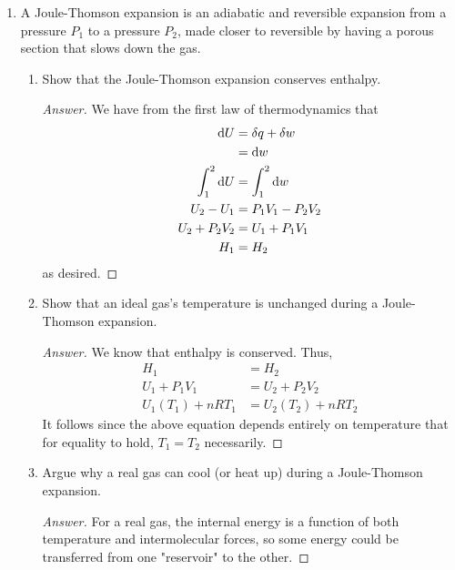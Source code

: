 \documentclass[../psets.tex]{subfiles}
\begin{document}
\begin{enumerate}
\begin{enumerate}
\begin{proof}[Answer]
\begin{align*}
                &= \SI{-3.10}{\kelvin}
            \end{align*}
            yielding a final lattice temperature of $\boxed{\SI{0.90}{\kelvin}}$.
        \end{proof}
    \end{enumerate}
    \item A Joule-Thomson expansion is an adiabatic and reversible expansion from a pressure $P_1$ to a pressure $P_2$, made closer to reversible by having a porous section that slows down the gas.
    \begin{enumerate}
        \item Show that the Joule-Thomson expansion conserves enthalpy.
        \begin{proof}[Answer]
            We have from the first law of thermodynamics that
            \begin{align*}
                \dd{U} &= \var{q}+\var{w}\\
                &= \dd{w}\\
                \int_1^2\dd{U} &= \int_1^2\dd{w}\\
                U_2-U_1 &= P_1V_1-P_2V_2\\
                U_2+P_2V_2 &= U_1+P_1V_1\\
                H_1 &= H_2
            \end{align*}
            as desired.
        \end{proof}
        \item Show that an ideal gas's temperature is unchanged during a Joule-Thomson expansion.
        \begin{proof}[Answer]
            We know that enthalpy is conserved. Thus,
            \begin{align*}
                H_1 &= H_2\\
                U_1+P_1V_1 &= U_2+P_2V_2\\
                U_1(T_1)+nRT_1 &= U_2(T_2)+nRT_2
            \end{align*}
            It follows since the above equation depends entirely on temperature that for equality to hold, $T_1=T_2$ necessarily.
        \end{proof}
        \item Argue why a real gas can cool (or heat up) during a Joule-Thomson expansion.
        \begin{proof}[Answer]
            For a real gas, the internal energy is a function of both temperature and intermolecular forces, so some energy could be transferred from one "reservoir" to the other.

\end{proof}
\end{enumerate}
\end{enumerate}
\end{document}
